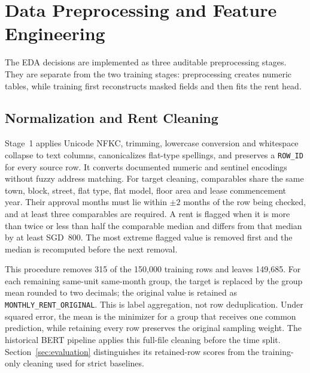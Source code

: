 \section{Data Preprocessing and Feature Engineering}\label{sec:preprocessing}
The EDA decisions are implemented as three auditable preprocessing stages.  They are separate from the two training stages: preprocessing creates numeric tables, while training first reconstructs masked fields and then fits the rent head.

\subsection{Normalization and Rent Cleaning}
Stage~1 applies Unicode NFKC, trimming, lowercase conversion and whitespace collapse to text columns, canonicalizes flat-type spellings, and preserves a \texttt{ROW\_ID} for every source row.  It converts documented numeric and sentinel encodings without fuzzy address matching.  For target cleaning, comparables share the same town, block, street, flat type, flat model, floor area and lease commencement year.  Their approval months must lie within $\pm2$ months of the row being checked, and at least three comparables are required.  A rent is flagged when it is more than twice or less than half the comparable median and differs from that median by at least SGD~800.  The most extreme flagged value is removed first and the median is recomputed before the next removal.

This procedure removes 315 of the 150,000 training rows and leaves 149,685.  For each remaining same-unit same-month group, the target is replaced by the group mean rounded to two decimals; the original value is retained as \texttt{MONTHLY\_RENT\_ORIGINAL}.  This is label aggregation, not row deduplication.  Under squared error, the mean is the minimizer for a group that receives one common prediction, while retaining every row preserves the original sampling weight.  The historical BERT pipeline applies this full-file cleaning before the time split.  Section~\ref{sec:evaluation} distinguishes its retained-row scores from the training-only cleaning used for strict baselines.

